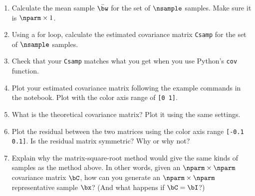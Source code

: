 \documentclass[11pt,titlepage,fleqn]{article}
\begin{document}
\begin{enumerate}
\item Calculate the mean sample $\bar{\bw}$ for the set of $\nsample$ samples. Make sure it is $\nparm \times 1$.

\item Using a for loop, calculate the estimated covariance matrix \verb+Csamp+ for the set of $\nsample$ samples.

\item Check that your \verb+Csamp+ matches what you get when you use Python's \verb+cov+ function.

\item Plot your estimated covariance matrix following the example commands in the notebook. Plot with the color axis range of \verb+[0 1]+.

\item What is the theoretical covariance matrix? Plot it using the same settings.

\vertgap

\item Plot the residual between the two matrices using the color axis range \verb+[-0.1 0.1]+.
Is the residual matrix symmetric? Why or why not?

\vertgap
\vertgap


\item Explain why the matrix-square-root method would give the same kinds of samples as the method above. In other words, given an $\nparm \times \nparm$ covariance matrix $\bC$, how can you generate an $\nparm \times \nparm$ representative sample $\bx$? (And what happens if $\bC = \bI$?)

\end{enumerate}

\end{document}
